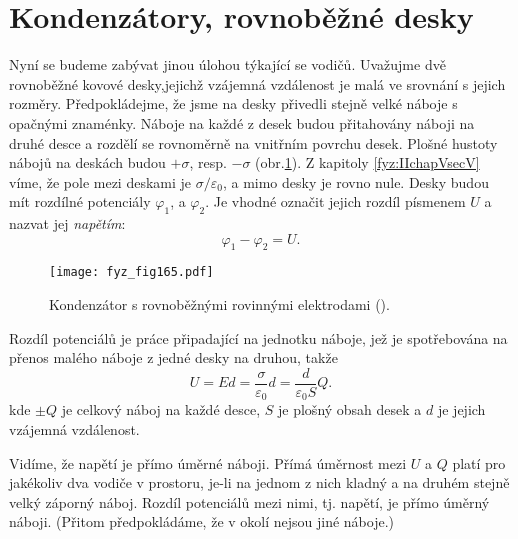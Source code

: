 \section{Kondenzátory, rovnoběžné desky}\label{fyz:IIchapVsecXIX}
  Nyní se budeme zabývat jinou úlohou týkající se vodičů. Uvažujme dvě rovnoběžné kovové 
  desky,jejichž vzájemná vzdálenost je malá ve srovnání s jejich rozměry. Předpokládejme, že jsme
  na desky přivedli stejně velké náboje s opačnými znaménky. Náboje na každé z desek budou 
  přitahovány náboji na druhé desce a rozdělí se rovnoměrně na vnitřním povrchu desek. Plošné
  hustoty nábojů na deskách budou \(+\sigma\), resp. \(-\sigma\) (obr.\ref{fyz:fig165}). Z kapitoly 
  \ref{fyz:IIchapVsecV} víme, že pole mezi deskami je \(\sigma/\varepsilon_0\), a mimo desky je 
  rovno nule. Desky budou mít rozdílné potenciály \(\varphi_1\), a \(\varphi_2\). Je vhodné označit 
  jejich rozdíl písmenem \(U\) a nazvat jej \emph{napětím}:
  \begin{equation}\label{fyz:eq292}
    \varphi_1 - \varphi_2 = U.
  \end{equation}
  
  \begin{figure}[ht!]  %
    \centering
    \texttt{[image: fyz\_fig165.pdf]}
    \caption{Kondenzátor s rovnoběžnými rovinnými elektrodami 
             (\cite[s.~114]{Feynman02}).}
    \label{fyz:fig165}
  \end{figure}
  
  Rozdíl potenciálů je práce připadající na jednotku náboje, jež je spotřebována na přenos malého 
  náboje z jedné desky na druhou, takže
  \begin{equation}\label{fyz:eq293}
    U = Ed = \dfrac{\sigma}{\varepsilon_0}d = \dfrac{d}{\varepsilon_0S}Q.
  \end{equation}
  kde \(\pm Q\) je celkový náboj na každé desce, \(S\) je plošný obsah desek a \(d\) je jejich 
  vzájemná vzdálenost.
  
  Vidíme, že napětí je přímo úměrné náboji. Přímá úměrnost mezi \(U\) a \(Q\) platí pro jakékoliv 
  dva vodiče v prostoru, je-li na jednom z nich kladný a na druhém stejně velký záporný náboj. 
  Rozdíl potenciálů mezi nimi, tj. napětí, je přímo úměrný náboji. (Přitom předpokládáme, že v 
  okolí nejsou jiné náboje.)
  
